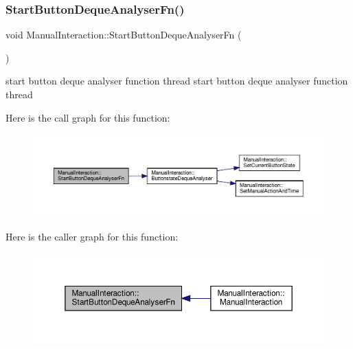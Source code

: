 \subsubsection{\texorpdfstring{Start\+Button\+Deque\+Analyser\+Fn()}{StartButtonDequeAnalyserFn()}}
{\footnotesize\ttfamily void Manual\+Interaction\+::\+Start\+Button\+Deque\+Analyser\+Fn (\begin{DoxyParamCaption}{ }\end{DoxyParamCaption})}



start button deque analyser function thread start button deque analyser function thread 

Here is the call graph for this function\+:
\nopagebreak
\begin{figure}[H]
\begin{center}
\leavevmode
\includegraphics[width=350pt]{classManualInteraction_a699be8c82fda18597d11caf8f3a07fe8_cgraph}
\end{center}
\end{figure}
Here is the caller graph for this function\+:
\nopagebreak
\begin{figure}[H]
\begin{center}
\leavevmode
\includegraphics[width=350pt]{classManualInteraction_a699be8c82fda18597d11caf8f3a07fe8_icgraph}
\end{center}
\end{figure}
\mbox{\label{classManualInteraction_a251516a6a71bd8a966cfa771733e501b}} 
